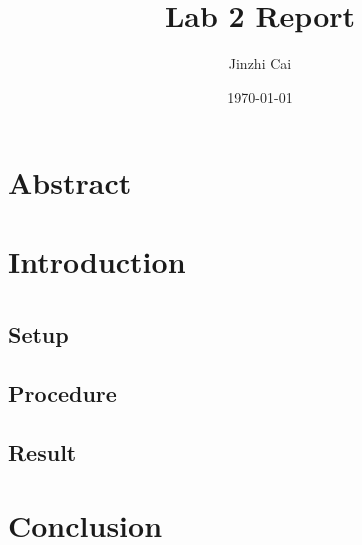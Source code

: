 \documentclass{article}
\title{Lab 2 Report}
\author{Jinzhi Cai}
\date{\today}
\begin{document}
\maketitle
\newpage
\tableofcontents
\clearpage
\section{Abstract}
\section{Introduction}
\clearpage
\section{}
\subsection{Setup}
\subsection{Procedure}
\subsection{Result}
\clearpage
\section{Conclusion}
\end{document}
